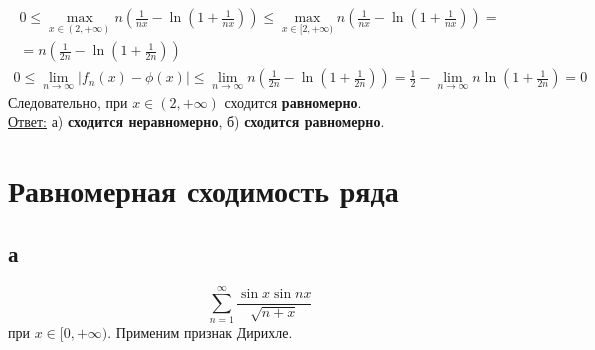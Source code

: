 \documentclass[a5paper, 10pt]{article}
\theoremstyle{definition}
\theoremstyle{plain}
\theoremstyle{remark}
\begin{document}
\begin{multline*}
0 \leq \max \limits_{x \in (2, + \infty) }  n \left( \frac{1}{nx}- \ln \left( 1+ \frac{1}{nx} \right)  \right) \leq \max \limits_{x \in [2, + \infty) }  n \left( \frac{1}{nx}- \ln \left( 1+ \frac{1}{nx} \right)  \right) =\\
=  n \left( \frac{1}{2n}- \ln \left( 1+ \frac{1}{2n} \right)  \right)
\end{multline*}
\begin{multline*}
0 \leq \lim_{n \to \infty} \left| f_n (x) - \phi(x)  \right| \leq \lim_{n \to \infty} n \left( \frac{1}{2n}- \ln \left( 1+ \frac{1}{2n} \right)  \right) =
 \frac{1}{2} - \lim_{n \to \infty} n \ln \left( 1+ \frac{1}{2n} \right)  = 0
\end{multline*}
Следовательно, при $x \in (2, + \infty)$ сходится \textbf{равномерно}.\\

\underline{Ответ:}  а) \textbf{сходится неравномерно}, б) \textbf{сходится равномерно}.


\newpage
\section{Равномерная сходимость ряда}
\subsection{а}
\begin{equation*}
\sum  \limits_{n = 1}^{\infty} \frac{\sin x \sin nx}{\sqrt{n + x}}
\end{equation*}
при $ x \in [0, + \infty)$.
Применим признак Дирихле. 


\newpage
\end{document}
